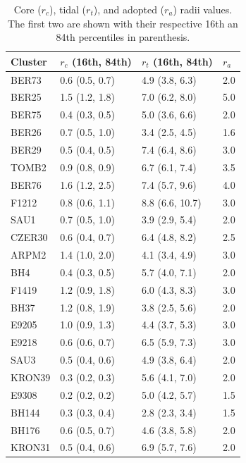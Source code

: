 \documentclass[draft]{aa}
\begin{document}
  \begin{table}
  \caption{Core ($r_{c}$), tidal ($r_{t}$), and adopted ($r_{a}$) radii values.
  The first two are shown with their respective 16th an 84th percentiles in
  parenthesis.}
  \label{tab:radii}
  \centering
  \begin{tabular}{llll}
  \hline\hline
  Cluster & $r_{c}$ (16th, 84th) &  $r_{t}$ (16th, 84th) & $r_{a}$\\
  \hline
   BER73         & 0.6 (0.5, 0.7) &  4.9 (3.8, 6.3) &  2.0\\
   BER25         & 1.5 (1.2, 1.8) &  7.0 (6.2, 8.0) &  5.0\\
   BER75         & 0.4 (0.3, 0.5) &  5.0 (3.6, 6.6) &  2.0\\
   BER26         & 0.7 (0.5, 1.0) &  3.4 (2.5, 4.5) &  1.6\\
   BER29         & 0.5 (0.4, 0.5) &  7.4 (6.4, 8.6) &  3.0\\
   TOMB2         & 0.9 (0.8, 0.9) &  6.7 (6.1, 7.4) &  3.5\\
   BER76         & 1.6 (1.2, 2.5) &  7.4 (5.7, 9.6) &  4.0\\
   F1212         & 0.8 (0.6, 1.1) &  8.8 (6.6, 10.7) & 3.0\\
   SAU1          & 0.7 (0.5, 1.0) &  3.9 (2.9, 5.4) &  2.0\\
   CZER30        & 0.6 (0.4, 0.7) &  6.4 (4.8, 8.2) &  2.5\\
   ARPM2         & 1.4 (1.0, 2.0) &  4.1 (3.4, 4.9) &  3.0\\
   BH4           & 0.4 (0.3, 0.5) &  5.7 (4.0, 7.1) &  2.0\\
   F1419         & 1.2 (0.9, 1.8) &  6.0 (4.3, 8.3) &  3.0\\
   BH37          & 1.2 (0.8, 1.9) &  3.8 (2.5, 5.6) &  2.0\\
   E9205         & 1.0 (0.9, 1.3) &  4.4 (3.7, 5.3) &  3.0\\
   E9218         & 0.6 (0.6, 0.7) &  6.5 (5.9, 7.3) &  3.0\\
   SAU3          & 0.5 (0.4, 0.6) &  4.9 (3.8, 6.4) &  2.0\\
   KRON39        & 0.3 (0.2, 0.3) &  5.6 (4.1, 7.0) &  2.0\\
   E9308         & 0.2 (0.2, 0.2) &  5.0 (4.2, 5.7) &  1.5\\
   BH144         & 0.3 (0.3, 0.4) &  2.8 (2.3, 3.4) &  1.5\\
   BH176         & 0.6 (0.5, 0.7) &  4.6 (3.8, 5.8) &  2.0\\
   KRON31        & 0.5 (0.4, 0.6) &  6.9 (5.7, 7.6) &  2.0\\

\end{tabular}
\end{table}
\end{document}
